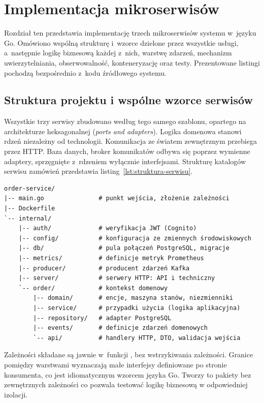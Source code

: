 \chapter{Implementacja mikroserwisów}
\label{chap:implementacja-mikroserwisow}

Rozdział ten przedstawia implementację trzech mikroserwisów systemu w~języku Go. Omówiono wspólną strukturę
i~wzorce dzielone przez wszystkie usługi, a~następnie logikę biznesową każdej z~nich, warstwę zdarzeń, mechanizm
uwierzytelniania, obserwowalność, konteneryzację oraz testy. Prezentowane listingi pochodzą bezpośrednio z~kodu
źródłowego systemu.

\section{Struktura projektu i wspólne wzorce serwisów}
\label{sec:struktura-projektu}

Wszystkie trzy serwisy zbudowano według tego samego szablonu, opartego na architekturze heksagonalnej
(\emph{ports and adapters}). Logika domenowa stanowi rdzeń niezależny od technologii. Komunikacja ze światem
zewnętrznym przebiega przez HTTP. Baza danych, broker komunikatów odbywa się poprzez wymienne adaptery, sprzęgnięte
z~rdzeniem wyłącznie interfejsami. Strukturę katalogów serwisu zamówień przedstawia listing~\ref{lst:struktura-serwisu}.

\begin{lstlisting}[caption={Struktura katalogów serwisu zamówień},label={lst:struktura-serwisu}]
order-service/
|-- main.go               # punkt wejścia, złożenie zależności
|-- Dockerfile
`-- internal/
    |-- auth/             # weryfikacja JWT (Cognito)
    |-- config/           # konfiguracja ze zmiennych środowiskowych
    |-- db/               # pula połączeń PostgreSQL, migracje
    |-- metrics/          # definicje metryk Prometheus
    |-- producer/         # producent zdarzeń Kafka
    |-- server/           # serwery HTTP: API i techniczny
    `-- order/            # kontekst domenowy
        |-- domain/       # encje, maszyna stanów, niezmienniki
        |-- service/      # przypadki użycia (logika aplikacyjna)
        |-- repository/   # adapter PostgreSQL
        |-- events/       # definicje zdarzeń domenowych
        `-- api/          # handlery HTTP, DTO, walidacja wejścia
\end{lstlisting}

Zależności składane są jawnie w~funkcji , bez wstrzykiwania zależności. Granice pomiędzy
warstwami wyznaczają małe interfejsy definiowane po stronie konsumenta, co jest idiomatycznym wzorcem języka Go.
Tworzy to pakiety bez zewnętrznych zależności co pozwala testować logikę biznesową w odpowiedniej izolacji.

